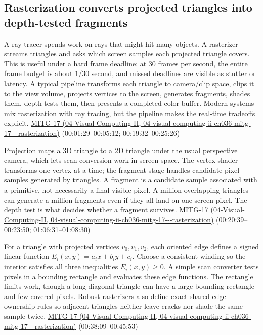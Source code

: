 \subsection{Rasterization converts projected triangles into depth-tested fragments}\label{03-visual-computing-i-ch015-rasterization-converts-projected-triangles-into-depth-tested-fragments}

A ray tracer spends work on rays that might hit many objects. A rasterizer streams triangles and asks which screen samples each projected triangle covers. This is useful under a hard frame deadline: at 30 frames per second, the entire frame budget is about \(1/30\) second, and missed deadlines are visible as stutter or latency. A typical pipeline transforms each triangle to camera/clip space, clips it to the view volume, projects vertices to the screen, generates fragments, shades them, depth-tests them, then presents a completed color buffer. Modern systems mix rasterization with ray tracing, but the pipeline makes the real-time tradeoffs explicit. \href{../04-Visual-Computing-II/main.pdf\#nameddest=04-visual-computing-ii-ch036-mitg-17---rasterization}{MITG-17 (04-Visual-Computing-II, 04-visual-computing-ii-ch036-mitg-17-\/-\/-rasterization)} (00:01:29--00:05:12; 00:19:32--00:25:26)

Projection maps a 3D triangle to a 2D triangle under the usual perspective camera, which lets scan conversion work in screen space. The vertex shader transforms one vertex at a time; the fragment stage handles candidate pixel samples generated by triangles. A fragment is a candidate sample associated with a primitive, not necessarily a final visible pixel. A million overlapping triangles can generate a million fragments even if they all land on one screen pixel. The depth test is what decides whether a fragment survives. \href{../04-Visual-Computing-II/main.pdf\#nameddest=04-visual-computing-ii-ch036-mitg-17---rasterization}{MITG-17 (04-Visual-Computing-II, 04-visual-computing-ii-ch036-mitg-17-\/-\/-rasterization)} (00:20:39--00:23:50; 01:06:31--01:08:30)

For a triangle with projected vertices \(v_0,v_1,v_2\), each oriented edge defines a signed linear function \(E_i(x,y)=a_i x+b_i y+c_i\). Choose a consistent winding so the interior satisfies all three inequalities \(E_i(x,y)\ge 0\). A simple scan converter tests pixels in a bounding rectangle and evaluates these edge functions. The rectangle limits work, though a long diagonal triangle can have a large bounding rectangle and few covered pixels. Robust rasterizers also define exact shared-edge ownership rules so adjacent triangles neither leave cracks nor shade the same sample twice. \href{../04-Visual-Computing-II/main.pdf\#nameddest=04-visual-computing-ii-ch036-mitg-17---rasterization}{MITG-17 (04-Visual-Computing-II, 04-visual-computing-ii-ch036-mitg-17-\/-\/-rasterization)} (00:38:09--00:45:53)

